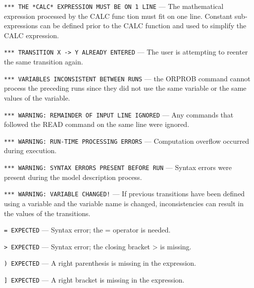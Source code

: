 \noindent \verb|*** THE *CALC* EXPRESSION MUST BE ON 1 LINE| --- 
The mathematical expression processed by the CALC func tion must fit on one
line.  Constant sub-expressions can be defined prior to the CALC function and
used to simplify the CALC expression.

\noindent \verb|*** TRANSITION X -> Y ALREADY ENTERED| --- 
The user is attempting to reenter the same transition again.

\noindent \verb|*** VARIABLES INCONSISTENT BETWEEN RUNS| --- 
the ORPROB command cannot process the preceding runs 
since they did not use the same variable or the same values of the variable.

\noindent \verb|*** WARNING: REMAINDER OF INPUT LINE IGNORED| --- 
Any commands that followed the READ command on 
the same line were ignored.

\noindent \verb|*** WARNING: RUN-TIME PROCESSING ERRORS| --- 
Computation overflow occurred during execution.

\noindent \verb|*** WARNING: SYNTAX ERRORS PRESENT BEFORE RUN| --- 
Syntax errors were present during the model description process.

\noindent \verb|*** WARNING: VARIABLE CHANGED!| --- 
If previous transitions have been defined using a variable and the variable 
name is changed, inconsistencies can result in the values of the transitions.

\noindent \verb|= EXPECTED| --- 
Syntax error; the = operator is needed.

\noindent \verb|> EXPECTED| --- 
Syntax error; the closing bracket > is missing.

\noindent \verb|) EXPECTED| --- 
A right parenthesis is missing in the expression.

\noindent \verb|] EXPECTED| --- 
A right bracket is missing in the expression.




















